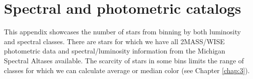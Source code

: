 \chapter{Spectral and photometric catalogs}\label{Appendix:1}
This appendix showcases the number of stars from binning by both luminosity and spectral classes. There are \bincount stars for which we have all 2MASS/WISE photometric data and spectral/luminosity information from the Michigan Spectral Altases available. The scarcity of stars in some bins limits the range of classes for which we can calculate average or median color (see Chapter \ref{chap:3}).




